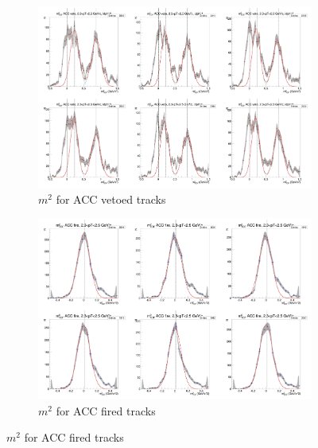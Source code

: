 \begin{figure}[H]
  \ContinuedFloat
    \begin{subfigure}{1\textwidth}
    \includegraphics[width=1\textwidth]{hiptfits/neg/PSm2_cent0_ich0_accfire0_ptbin9.jpg}
    \caption{$m^2$ for ACC vetoed tracks}
    \end{subfigure}
    \begin{subfigure}{1\textwidth}
    \includegraphics[width=1\textwidth]{hiptfits/neg/PSm2_cent0_ich0_accfire1_ptbin9.jpg}
    \caption{$m^2$ for ACC fired tracks}
    \end{subfigure}  
\end{figure}
